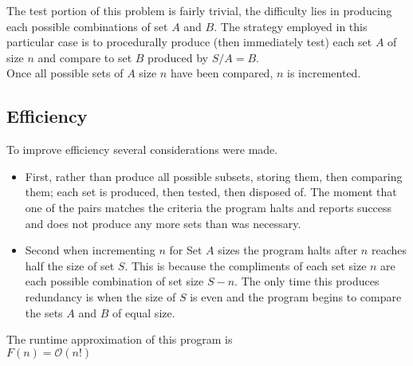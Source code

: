 \documentclass[a4paper,man,natbib]{apa6}
\begin{document}
The test portion of this problem is fairly trivial, the difficulty lies in producing each possible combinations of set $A$ and $B$. The strategy employed in this particular case is to procedurally produce (then immediately test) each set $A$ of size $n$ and compare to set $B$ produced by $ S \slash A = B $. \\
Once all possible sets of $A$ size $n$ have been compared, $n$ is incremented.

\subsection{Efficiency}

To improve efficiency several considerations were made.
\begin{itemize}
\item First, rather than produce all possible subsets, storing them, then comparing them; each set is produced, then tested, then disposed of. The moment that one of the pairs matches the criteria the program halts and reports success and does not produce any more sets than was necessary.
\item Second when incrementing $n$ for Set $A$ sizes the program halts after $n$ reaches half the size of set $S$. This is because the compliments of each set size $n$ are each possible combination of set size $S{} - n$. The only time this produces redundancy is when the size of $S$ is even and the program begins to compare the sets $A$ and $B$ of equal size.
\end{itemize}
\noindent
The runtime approximation of this program is \\
$F(n) = \mathcal{O}(n!)$


\nocite{sebasta}

\end{document}
